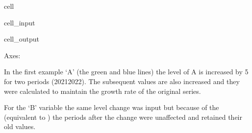 \documentclass[letterpaper,10pt,english]{jupyterBook}
\begin{document}
\begin{sphinxuseclass}{cell}\begin{sphinxVerbatimInput}

\begin{sphinxuseclass}{cell_input}
\begin{sphinxVerbatim}[commandchars=\\\{\}]

\PYG{p}{[}\PYG{p}{[}\PYG{p}{]}\PYG{p}{]}
    
\end{sphinxVerbatim}

\end{sphinxuseclass}\end{sphinxVerbatimInput}
\begin{sphinxVerbatimOutput}

\begin{sphinxuseclass}{cell_output}
\begin{sphinxVerbatim}[commandchars=\\\{\}]
\PYGZlt{}Axes: \PYGZgt{}
\end{sphinxVerbatim}

\noindent{}

\end{sphinxuseclass}\end{sphinxVerbatimOutput}

\end{sphinxuseclass}
\sphinxAtStartPar
In the first example ‘A’ (the green and blue lines) the level of A is increased by 5 for two periods (2021\sphinxhyphen{}2022). The subsequent values are also increased and they were calculated to maintain the growth rate of the original series.

\sphinxAtStartPar
For the ‘B’ variable the same level change was input but because of the  (equivalent to ) the periods after the change were unaffected and retained their old values.
\end{document}
